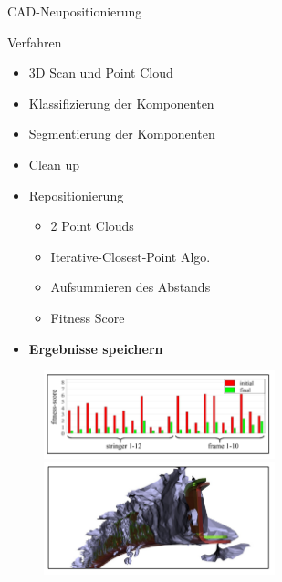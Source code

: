 \begin{frame}{CAD-Neupositionierung}
    \begin{minipage}[]{0.49\textwidth}
    \begin{block}{Verfahren}
        \begin{itemize}
            \item 3D Scan und Point Cloud
            \item Klassifizierung der Komponenten
            \item Segmentierung der Komponenten
            \item Clean up
            \item Repositionierung
            \begin{itemize}
                \item 2 Point Clouds
                \item Iterative-Closest-Point Algo.
                \item Aufsummieren des Abstands
                \item Fitness Score
            \end{itemize}
            \item \textbf{Ergebnisse speichern}
        \end{itemize}
    \end{block}
    \end{minipage}
    \begin{minipage}[]{0.49\textwidth}
      \begin{figure}
          \includegraphics[width=190pt]{img_niklas/results_repo.PNG}
          \includegraphics[width=190pt]{img_niklas/inital_vs_final.PNG}
          \label{fig:my_label}
      \end{figure}
    \end{minipage}
\end{frame}

